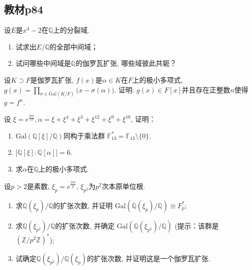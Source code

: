 \subsection{教材p84}

\begin{problem}
    设$E$是$x^4-2$在$\mathbb{Q}$上的分裂域.
\begin{enumerate}[(1)]
    \item 试求出$E/\mathbb{Q}$的全部中间域；
    \item 试问哪些中间域是$\mathbb{Q}$的伽罗瓦扩张, 哪些域彼此共轭？
\end{enumerate}
\end{problem}

\begin{solution}
    
\end{solution}

\begin{problem}
    设$K \supset F$是伽罗瓦扩张, $f(x)$是$\alpha \in K$在$F$上的极小多项式, 
\(
    g(x) = \prod_{\sigma \in \mathrm{Gal}(K/F)} \big(x - \sigma(\alpha) \big).
\)
证明: $g(x) \in F[x]$并且存在正整数$n$使得$g = f^n$.
\end{problem}

\begin{solution}
    
\end{solution}

\begin{problem}
    设
$\xi = e^{\frac{2\pi i}{13}}, \alpha = \xi + \xi^4 + \xi^3 + \xi^{12} + \xi^9 + \xi^{10}$,
证明：
\begin{enumerate}[(1)]
    \item $\mathrm{Gal}\left(\mathbb{Q}[\xi]/\mathbb{Q}\right)$同构于乘法群
$\mathbb{F}_{13}^* = \mathbb{F}_{13} \setminus \{0\}$.
    \item $\bigl[\mathbb{Q}[\xi]:\mathbb{Q}[\alpha]\bigr] = 6$.
    \item 求$\alpha$在$\mathbb{Q}$上的极小多项式.
\end{enumerate}
\end{problem}

\begin{solution}
    
\end{solution}

\begin{problem}
    设$p > 2$是素数, $\xi_p = e^{\frac{2\pi i}p},\, \xi_{p^2}$为$p^2$次本原单位根. 
\begin{enumerate}[(1)]
    \item 求$\mathbb{Q}(\xi_p)/\mathbb{Q}$的扩张次数, 并证明
$\mathrm{Gal}(\mathbb{Q}(\xi_p)/\mathbb{Q}) \cong F_p^*$;
    \item 求$\mathbb{Q}(\xi_{p^2})/\mathbb{Q}$的扩张次数, 并确定
$\mathrm{Gal}(\mathbb{Q}(\xi_{p^2})/\mathbb{Q})$
(提示：该群是$(\mathbb{Z}/p^2\mathbb{Z})^*$);
    \item 试确定$\mathbb{Q}(\xi_{p^2})/\mathbb{Q}(\xi_p)$的扩张次数, 并证明这是一个伽罗瓦扩张.
\end{enumerate}
\end{problem}

